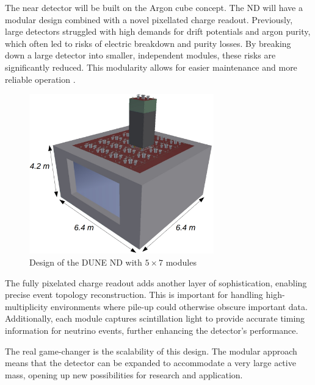 The near detector will be built on the Argon cube concept.
The ND will have a modular design combined with a novel pixellated charge readout.
Previously, large detectors struggled with high demands for drift potentials and argon purity, which often led to risks of electric breakdown and purity losses.
By breaking down a large detector into smaller, independent modules, these risks are significantly reduced.
This modularity allows for easier maintenance and more reliable operation \cite{Biron_2020}.

\begin{figure}[H]
  \centering
  \includegraphics[width=80mm]{figures/nd.png}
  \caption{Design of the DUNE ND with $5 \times 7$ modules \cite{DUNE_2020a}}
  \label{nd}
\end{figure}

The fully pixelated charge readout adds another layer of sophistication, enabling precise event topology reconstruction.
This is important for handling high-multiplicity environments where pile-up could otherwise obscure important data.
Additionally, each module captures scintillation light to provide accurate timing information for neutrino events, further enhancing the detector's performance.

The real game-changer is the scalability of this design.
The modular approach means that the detector can be expanded to accommodate a very large active mass, opening up new possibilities for research and application.

